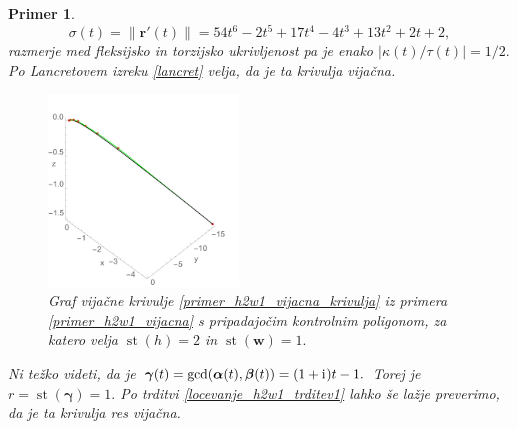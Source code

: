 \documentclass[12pt,a4paper,twoside]{article}
\newcommand{\iu}{\mathrm{i}\mkern1mu} %
\theoremstyle{definition} %
\theoremstyle{plain} %
\theoremstyle{primerstyle}
\newtheorem{primer}[definicija]{Primer}
\numberwithin{equation}{section}  %
\newcommand{\rV}{\mathbf{r}}
\newcommand{\wV}{\mathbf{w}}
\newcommand{\balpha}{\boldsymbol \alpha}
\newcommand{\bbeta}{\boldsymbol \beta}
\newcommand{\bgamma}{\boldsymbol \gamma}
\DeclareMathOperator{\st}{st}
\begin{document}
\begin{primer}
	\begin{equation*}
		\sigma(t)=\lVert\rV'(t)\rVert=54t^6-2t^5+17t^4-4t^3+13t^2+2t+2,
	\end{equation*}
	razmerje med fleksijsko in torzijsko ukrivljenost pa je enako $|\kappa(t)/\tau(t)|=1/2.$ Po Lancretovem izreku \ref{lancret} velja, da je ta krivulja vijačna.
	\begin{figure}[h]
	  \centering
	  \includegraphics[width=0.45\textwidth]{images/h2w1_vijacna.pdf}
	  \caption[Primer vijačne krivulje ($\st(h)=2,$ $\st(\wV)=1$)]{Graf vijačne krivulje \eqref{primer_h2w1_vijacna_krivulja} iz primera \ref{primer_h2w1_vijacna} s pripadajočim kontrolnim poligonom, za katero velja $\st(h)=2$ in $\st(\wV)=1.$}
	  \label{fig:h2w1_vijacna}
	\end{figure}
	
	Ni težko videti, da je $\bgamma(t)=\gcd(\balpha(t),\bbeta(t))=(1+\iu)t-1.$ Torej je $r=\st(\bgamma)=1.$ Po trditvi \ref{locevanje_h2w1_trditev1} lahko še lažje preverimo, da je ta krivulja res vijačna.
\end{primer}
\end{document}
